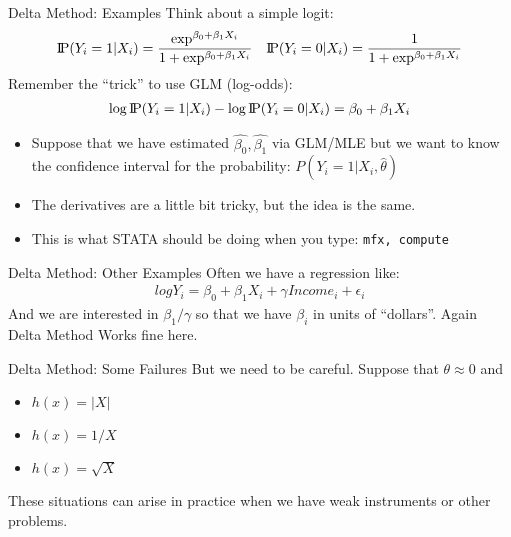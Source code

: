 \begin{frame}{Delta Method: Examples}
Think about a simple logit:
\begin{eqnarray*}
\text{I\kern-0.15em P}(Y_i=1 | X_i ) = \frac{\exp^{\beta_0 + \beta_1 X_i}}{1+\exp^{\beta_0 + \beta_1 X_i}}  \quad \text{I\kern-0.15em P}(Y_i=0 | X_i ) = \frac{1}{1+\exp^{\beta_0 + \beta_1 X_i}} 
\end{eqnarray*}
Remember the ``trick'' to use GLM (log-odds):
\begin{eqnarray*}
\log \text{I\kern-0.15em P}(Y_i=1 | X_i) - \log \text{I\kern-0.15em P}(Y_i=0 | X_i) = \beta_0 + \beta_1 X_i
\end{eqnarray*}
\begin{itemize}
\item Suppose that we have estimated $\hat{\beta_0},\hat{\beta_1}$ via GLM/MLE but we want to know the confidence interval for the probability: $P(Y_i=1 | X_i,\hat{\theta})$
\item The derivatives are a little bit tricky, but the idea is the same.
\item This is what STATA should be doing when you type: \tt{mfx, compute}
\end{itemize}
\end{frame}

\begin{frame}{Delta Method: Other Examples}
Often we have a regression like:
\begin{eqnarray*}
log Y_i = \beta_0 + \beta_1 X_i + \gamma Income_i + \epsilon_i
\end{eqnarray*}
And we are interested in $\beta_1 / \gamma$ so that we have $\beta_i$ in units of ``dollars''. Again Delta Method Works fine here.\\
\end{frame}


\begin{frame}{Delta Method: Some Failures}
But we need to be careful.  Suppose that $\theta \approx 0$ and 
\begin{itemize}
\item $h(x)  = |X|$
\item $h(x)  = 1/X$
\item $h(x)  = \sqrt{X}$
\end{itemize}
These situations can arise in practice when we have weak instruments or other problems.
\end{frame}



